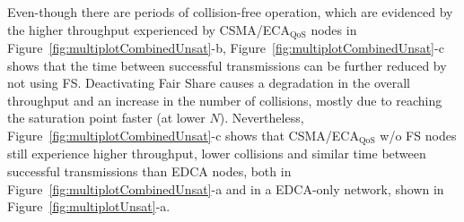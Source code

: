 


Even-though there are periods of collision-free operation, which are evidenced by the higher throughput experienced by CSMA/ECA$_{\text{QoS}}$ nodes in Figure~\ref{fig:multiplotCombinedUnsat}-b, Figure~\ref{fig:multiplotCombinedUnsat}-c shows that the time between successful transmissions can be further reduced by not using FS. Deactivating Fair Share causes a degradation in the overall throughput and an increase in the number of collisions, mostly due to reaching the saturation point faster (at lower $N$). Nevertheless, Figure~\ref{fig:multiplotCombinedUnsat}-c shows that CSMA/ECA$_{\text{QoS}}$ w/o FS nodes still experience higher throughput, lower collisions and similar time between successful transmissions than EDCA nodes, both in Figure~\ref{fig:multiplotCombinedUnsat}-a and in a EDCA-only network, shown in Figure~\ref{fig:multiplotUnsat}-a.


